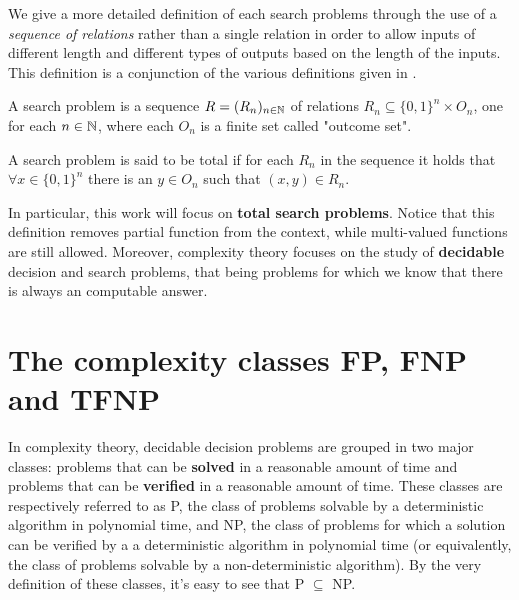 We give a more detailed definition of each search problems through the use of a \textit{sequence of relations} rather than a single relation in order to allow inputs of different length and different types of outputs based on the length of the inputs. This definition is a conjunction of the various definitions given in \cite{search_problems_dt_model, rel_comp_np_search, proofs_circuits_communication, tfnp_characterization}.

\newpage

\begin{definition}
    A search problem is a sequence $R = (R_n)_{n \in \mathbb{N}}$ of relations $R_n \subseteq \{0,1\}^n \times O_n$, one for each $n \in \mathbb{N}$, where each $O_n$ is a finite set called "outcome set".

    A search problem is said to be total if for each $R_n$ in the sequence it holds that $\forall x \in \{0,1\}^n$ there is an $y \in O_n$ such that $(x,y) \in R_n$.
\end{definition}

In particular, this work will focus on \textbf{total search problems}. Notice that this definition removes partial function from the context, while multi-valued functions are still allowed. Moreover, complexity theory focuses on the study of \textbf{decidable} decision and search problems, that being problems for which we know that there is always an computable answer.

\quad

\section{The complexity classes \textsf{FP}, \textsf{FNP} and \textsf{TFNP}}

In complexity theory, decidable decision problems are grouped in two major classes: problems that can be \textbf{solved} in a reasonable amount of time and problems that can be \textbf{verified} in a reasonable amount of time. These classes are respectively referred to as \textsf{P}, the class of problems solvable by a deterministic algorithm in polynomial time, and \textsf{NP}, the class of problems for which a solution can be verified by a a deterministic algorithm in polynomial time (or equivalently, the class of problems solvable by a non-deterministic algorithm). By the very definition of these classes, it's easy to see that \textsf{P} $\subseteq$ \textsf{NP}. 

